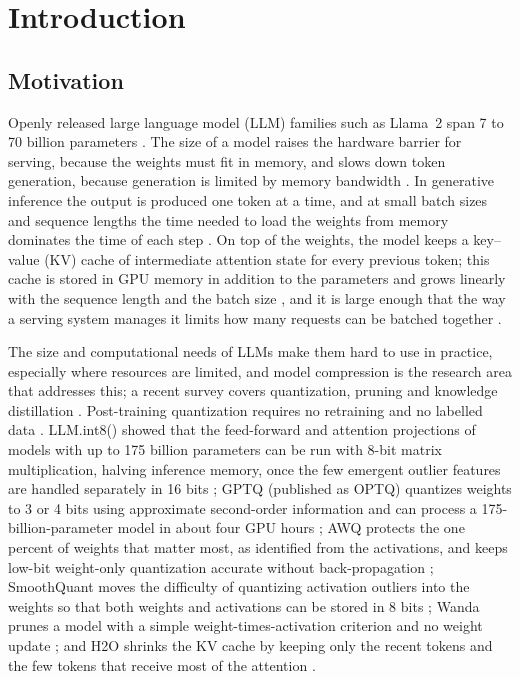 \chapter{Introduction}
\label{Chapter1}

\section{Motivation}
\label{sec:ch1-motivation}

Openly released large language model (LLM) families such as Llama~2 span 7 to 70 billion parameters \cite{touvron2023llama2}. The size of a model raises the hardware barrier for serving, because the weights must fit in memory, and slows down token generation, because generation is limited by memory bandwidth \cite{lin2024awq}. In generative inference the output is produced one token at a time, and at small batch sizes and sequence lengths the time needed to load the weights from memory dominates the time of each step \cite{pope2023efficiently}. On top of the weights, the model keeps a key--value (KV) cache of intermediate attention state for every previous token; this cache is stored in GPU memory in addition to the parameters and grows linearly with the sequence length and the batch size \cite{zhang2023h2o}, and it is large enough that the way a serving system manages it limits how many requests can be batched together \cite{kwon2023vllm}.

The size and computational needs of LLMs make them hard to use in practice, especially where resources are limited, and model compression is the research area that addresses this; a recent survey covers quantization, pruning and knowledge distillation \cite{zhu2024survey}. Post-training quantization requires no retraining and no labelled data \cite{nagel2021whitepaper}. LLM.int8() showed that the feed-forward and attention projections of models with up to 175 billion parameters can be run with 8-bit matrix multiplication, halving inference memory, once the few emergent outlier features are handled separately in 16 bits \cite{dettmers2022llmint8}; GPTQ (published as OPTQ) quantizes weights to 3 or 4 bits using approximate second-order information and can process a 175-billion-parameter model in about four GPU hours \cite{frantar2023gptq}; AWQ protects the one percent of weights that matter most, as identified from the activations, and keeps low-bit weight-only quantization accurate without back-propagation \cite{lin2024awq}; SmoothQuant moves the difficulty of quantizing activation outliers into the weights so that both weights and activations can be stored in 8 bits \cite{xiao2023smoothquant}; Wanda prunes a model with a simple weight-times-activation criterion and no weight update \cite{sun2024wanda}; and H2O shrinks the KV cache by keeping only the recent tokens and the few tokens that receive most of the attention \cite{zhang2023h2o}.

